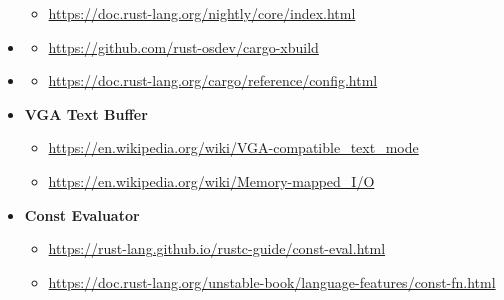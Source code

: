 \documentclass{article}
\begin{document}
\begin{itemize}
    \begin{itemize}
        \item \url{https://doc.rust-lang.org/nightly/core/index.html}
    \end{itemize}
    \item \hypertarget{ref:cargo-xbuild}{\textbf{\color{medium}{Cargo XBuild}}}
    \begin{itemize}
        \item \url{https://github.com/rust-osdev/cargo-xbuild}
    \end{itemize}
    \item \hypertarget{ref:cargo-config}{\textbf{\color{medium}{Cargo Config}}}
    \begin{itemize}
        \item \url{https://doc.rust-lang.org/cargo/reference/config.html}
    \end{itemize}
    \item \hypertarget{ref:vga}{\textbf{\color{medium}VGA Text Buffer}}
    \begin{itemize}
       \item \url{https://en.wikipedia.org/wiki/VGA-compatible_text_mode} 
       \item \url{https://en.wikipedia.org/wiki/Memory-mapped_I/O}
    \end{itemize}
    \item \hypertarget{ref:const-evaluator}{\textbf{\color{medium}Const Evaluator}}
    \begin{itemize}
        \item \url{https://rust-lang.github.io/rustc-guide/const-eval.html}
        \item \url{https://doc.rust-lang.org/unstable-book/language-features/const-fn.html}
    \end{itemize}
 \end{itemize}
\end{document}
